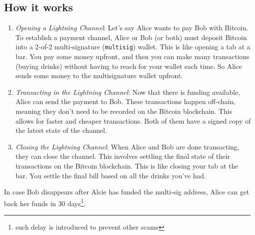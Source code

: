 \subsection{How it works}
\begin{enumerate}


   \item \textit{Opening a Lightning Channel}:
   Let's say Alice wants to pay Bob with Bitcoin. To establish a payment channel, Alice or Bob (or both) must deposit Bitcoin into a 2-of-2 multi-signature (\texttt{multisig}) wallet. This is like opening a tab at a bar. You pay some money upfront, and then you can make many transactions (buying drinks) without having to reach for your wallet each time.
   So Alice sends some money to the multisignature wallet upfront.

   \item \textit{Transacting in the Lightning Channel}:
   Now that there is funding available, Alice can send the payment to Bob. These transactions happen off-chain, meaning they don't need to be recorded on the Bitcoin blockchain. This allows for faster and cheaper transactions.
   Both of them have a signed copy of the latest state of the channel.

   \item \textit{Closing the Lightning Channel}:
   When Alice and Bob are done transacting, they can close the channel. This involves settling the final state of their transactions on the Bitcoin blockchain. This is like closing your tab at the bar. You settle the final bill based on all the drinks you've had.

\end{enumerate}

In case Bob disappears after Alcie has funded the multi-sig address, Alice can get back her funds in 30 days\footnote{such delay is introduced to prevent other scams}.


